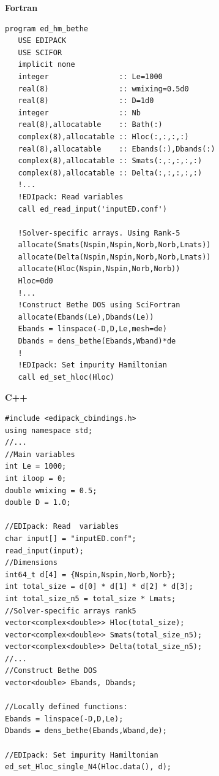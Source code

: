 \documentclass[edipack_sp.tex]{subfiles}
\begin{document}
\begin{center}
\begin{minipage}[t]{0.49\linewidth}
\textbf{Fortran}
\begin{lstlisting}[style=fstyle,frame=none,numbers=none,basicstyle={\scriptsize\ttfamily}]
program ed_hm_bethe
   USE EDIPACK
   USE SCIFOR
   implicit none
   integer                :: Le=1000
   real(8)                :: wmixing=0.5d0
   real(8)                :: D=1d0
   integer                :: Nb
   real(8),allocatable    :: Bath(:)
   complex(8),allocatable :: Hloc(:,:,:,:)
   real(8),allocatable    :: Ebands(:),Dbands(:)
   complex(8),allocatable :: Smats(:,:,:,:,:)
   complex(8),allocatable :: Delta(:,:,:,:,:)
   !...  
   !EDIpack: Read variables
   call ed_read_input('inputED.conf')
   
   !Solver-specific arrays. Using Rank-5  
   allocate(Smats(Nspin,Nspin,Norb,Norb,Lmats))
   allocate(Delta(Nspin,Nspin,Norb,Norb,Lmats))
   allocate(Hloc(Nspin,Nspin,Norb,Norb))
   Hloc=0d0
   !...
   !Construct Bethe DOS using SciFortran
   allocate(Ebands(Le),Dbands(Le))
   Ebands = linspace(-D,D,Le,mesh=de)
   Dbands = dens_bethe(Ebands,Wband)*de
   !
   !EDIpack: Set impurity Hamiltonian
   call ed_set_hloc(Hloc)
\end{lstlisting}
\end{minipage}
%
\begin{minipage}[t]{0.49\linewidth}
\textbf{C++}
\begin{lstlisting}[style=cstyle,frame=none,numbers=none,basicstyle={\scriptsize\ttfamily}]
#include <edipack_cbindings.h>
using namespace std;
//...
//Main variables
int Le = 1000;
int iloop = 0;
double wmixing = 0.5;
double D = 1.0;

//EDIpack: Read  variables    
char input[] = "inputED.conf"; 
read_input(input);      
//Dimensions
int64_t d[4] = {Nspin,Nspin,Norb,Norb};
int total_size = d[0] * d[1] * d[2] * d[3];
int total_size_n5 = total_size * Lmats;    
//Solver-specific arrays rank5
vector<complex<double>> Hloc(total_size);
vector<complex<double>> Smats(total_size_n5);
vector<complex<double>> Delta(total_size_n5);
//...
//Construct Bethe DOS
vector<double> Ebands, Dbands;

//Locally defined functions:
Ebands = linspace(-D,D,Le);
Dbands = dens_bethe(Ebands,Wband,de);

//EDIpack: Set impurity Hamiltonian
ed_set_Hloc_single_N4(Hloc.data(), d);
\end{lstlisting}
\end{minipage}
\end{center}
\end{document}
